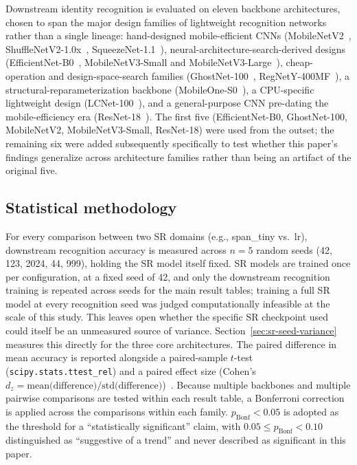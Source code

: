 \documentclass[pdflatex,sn-vancouver-num]{sn-jnl}
\begin{document}
Downstream identity recognition is evaluated on eleven backbone architectures, chosen to span the major design families of lightweight recognition networks rather than a single lineage: hand-designed mobile-efficient CNNs (MobileNetV2~\cite{sandler2018mobilenetv2}, ShuffleNetV2-1.0x~\cite{ma2018shufflenetv2}, SqueezeNet-1.1~\cite{iandola2016squeezenet}), neural-architecture-search-derived designs (EfficientNet-B0~\cite{tan2019efficientnet}, MobileNetV3-Small and MobileNetV3-Large~\cite{howard2019mobilenetv3}), cheap-operation and design-space-search families (GhostNet-100~\cite{han2020ghostnet}, RegNetY-400MF~\cite{radosavovic2020regnet}), a structural-reparameterization backbone (MobileOne-S0~\cite{vasu2023mobileone}), a CPU-specific lightweight design (LCNet-100~\cite{cui2021lcnet}), and a general-purpose CNN pre-dating the mobile-efficiency era (ResNet-18~\cite{he2016resnet}). The first five (EfficientNet-B0, GhostNet-100, MobileNetV2, MobileNetV3-Small, ResNet-18) were used from the outset; the remaining six were added subsequently specifically to test whether this paper's findings generalize across architecture families rather than being an artifact of the original five.

\subsection{Statistical methodology}
\label{sec:stats}

For every comparison between two SR domains (e.g., span\_tiny vs.\ lr), downstream recognition accuracy is measured across $n=5$ random seeds (42, 123, 2024, 44, 999), holding the SR model itself fixed. SR models are trained once per configuration, at a fixed seed of 42, and only the downstream recognition training is repeated across seeds for the main result tables; training a full SR model at every recognition seed was judged computationally infeasible at the scale of this study. This leaves open whether the specific SR checkpoint used could itself be an unmeasured source of variance. Section~\ref{sec:sr-seed-variance} measures this directly for the three core architectures. The paired difference in mean accuracy is reported alongside a paired-sample $t$-test (\texttt{scipy.stats.ttest\_rel}) and a paired effect size (Cohen's $d_z = \text{mean(difference)}/\text{std(difference)}$)~\cite{cohen1988statistical}. Because multiple backbones and multiple pairwise comparisons are tested within each result table, a Bonferroni correction~\cite{dunn1961multiple} is applied across the comparisons within each family. $p_{\text{Bonf}} < 0.05$ is adopted as the threshold for a ``statistically significant'' claim, with $0.05 \leq p_{\text{Bonf}} < 0.10$ distinguished as ``suggestive of a trend'' and never described as significant in this paper.
\end{document}
